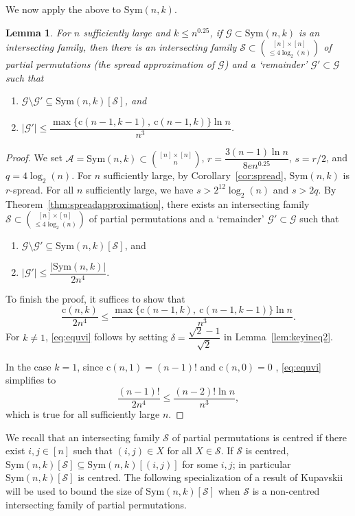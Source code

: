 \documentclass{amsart}
\newtheorem{lem}[thm]{Lemma}
\newcommand{\mcal}{\mathcal}
\newcommand{\sym}{\mathrm{Sym}}
\newcommand{\st}{\mathrm{c}}
\begin{document}
We now apply the above to $\sym(n,k)$.
\begin{lem}\label{lem:spreadapproxsymnk}
For $n$ sufficiently large and $k\leq n^{0.25}$, if $\mcal{G}\subset \sym(n,k)$ is an intersecting family, then there is an intersecting family $\mcal{S}\subset \binom{[n]\times [n]}{\leq 4\log_{2}(n)}$ of partial permutations (the spread approximation of $\mcal{G}$) and a `remainder' $\mcal{G}'\subset \mcal{G}$ such that 
\begin{enumerate}
\item $\mcal{G} \setminus \mcal{G}' \subseteq \sym(n,k)[\mcal{S}]$, and
\item $|\mcal{G}'|\leq \dfrac{\max\{\st(n-1,k-1),\ \st(n-1,k)\} \ln n}{n^{3}}$.
\end{enumerate}
\end{lem}
\begin{proof}
We set $\mcal{A}=\sym(n,k) \subset \binom{[n]\times [n]}{n}$, $r=\dfrac{3(n-1)\ln n}{8e n^{0.25}}$, $s=r/2$, and $q=4\log_{2}(n)$. For $n$ sufficiently large, by Corollary~\ref{cor:spread}, $\sym(n,k)$ is $r$-spread. For all $n$ sufficiently large, we have $s>2^{12}\log_{2}(n)$ and $s>2q$. By Theorem~\ref{thm:spreadapproximation}, there exists an intersecting family $\mcal{S}\subset \binom{[n]\times [n]}{\leq 4\log_{2}(n)}$ of partial permutations and a `remainder' $\mcal{G}'\subset \mcal{G}$ such that 
\begin{enumerate}
\item $\mcal{G} \setminus \mcal{G}' \subseteq \sym(n,k)[\mcal{S}]$, and
\item $|\mcal{G}'|\leq \dfrac{|\sym(n,k)|}{2n^{4}}$.
\end{enumerate}  
To finish the proof, it suffices to show that
\begin{equation}\label{eq:equvi}
\dfrac{\st(n,k)}{2n^{4}}\leq \dfrac{\max\{\st(n-1,k),\ \st(n-1,k-1)\}\ln n}{n^{3}}.
\end{equation} 
For $k\neq 1 $, \eqref{eq:equvi} follows by setting $\delta=\dfrac{\sqrt{2}-1}{\sqrt{2}}$ in Lemma~\ref{lem:keyineq2}. 

In the case $k=1$, since $\st(n,1)=(n-1)!$ and $\st(n,0)=0$ , \eqref{eq:equvi} simplifies to
\[\dfrac{(n-1)!}{2n^{4}} \leq \dfrac{(n-2)!\ln n}{n^{3}},\] which is true for all sufficiently large $n$. 
\end{proof}

We recall that an intersecting family $\mcal{S}$ of partial permutations is centred if there exist $i,j \in [n]$ such that $(i,j)\in X$ for all $X \in \mcal{S}$. If $\mcal{S}$ is centred, $\sym(n,k)[\mcal{S}]\subseteq \sym(n,k)[(i,j)]$ for some $i,j$; in particular $\sym(n,k)[\mcal{S}]$ is centred. The following specialization of a result of Kupavskii \cite[Theorem 14]{kupavskii2026erd} will be used to bound the size of $\sym(n,k)[\mcal{S}]$ when $\mcal{S}$ is a non-centred intersecting family of partial permutations.
\end{document}
